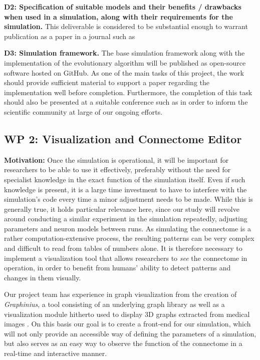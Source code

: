 \documentclass[a4paper,11pt]{article}
\begin{document}
\textbf{D2: Specification of suitable models and their benefits / drawbacks when used in a simulation, along with their requirements for the simulation.} This deliverable is considered to be substantial enough to warrant publication as a paper in a journal such as 


\textbf{D3: Simulation framework.} The base simulation framework along with the implementation of the evolutionary algorithm will be published as open-source software hosted on GitHub. As one of the main tasks of this project, the work should provide sufficient material to support a paper regarding the implementation well before completion. Furthermore, the completion of this task should also be presented at a suitable conference such as  in order to inform the scientific community at large of our ongoing efforts.
\\[0,2cm]



\subsection{WP 2: Visualization and Connectome Editor}

\textbf{Motivation:}
Once the simulation is operational, it will be important for researchers to be able to use it effectively, preferably without the need for specialist knowledge in the exact function of the simulation itself. Even if such knowledge is present, it is a large time investment to have to interfere with the simulation's code every time a minor adjustment needs to be made. While this is generally true, it holds particular relevance here, since our study will revolve around conducting a similar experiment in the simulation repeatedly, adjusting parameters and neuron models between runs. As simulating the connectome is a rather computation-extensive process, the resulting patterns can be very complex and difficult to read from tables of numbers alone. It is therefore necessary to implement a visualization tool that allows researchers to \emph{see} the connectome in operation, in order to benefit from humans' ability to detect patterns and changes in them visually.

Our project team has experience in graph visualization from the creation of \emph{Graphinius}, a tool consisting of an underlying graph library as well as a visualization module hitherto used to display 3D graphs extracted from medical images \citep{GraphExtractPaper}. On this basis our goal is to create a front-end for our simulation, which will not only provide an accessible way of defining the parameters of a simulation, but also serves as an easy way to observe the function of the connectome in a real-time and interactive manner.
\end{document}
